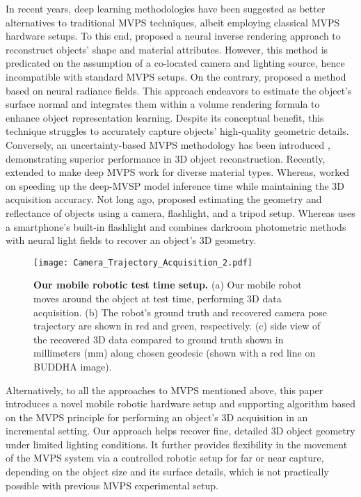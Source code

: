 \vspace{-0.2cm}
In recent years, deep learning methodologies have been suggested as better alternatives to traditional MVPS techniques, albeit employing classical MVPS hardware setups. To this end, \citep{zhang2022iron} proposed a neural inverse rendering approach to reconstruct objects' shape and material attributes. However, this method is predicated on the assumption of a co-located camera and lighting source, hence incompatible with standard MVPS setups. On the contrary, \citep{kaya2021neural}  proposed a method based on neural radiance fields. This approach endeavors to estimate the object's surface normal and integrates them within a volume rendering formula to enhance object representation learning. Despite its conceptual benefit, this technique struggles to accurately capture objects' high-quality geometric details.
Conversely, an uncertainty-based MVPS methodology has been introduced \citep{kaya2022uncertainty}, demonstrating superior performance in 3D object reconstruction. Recently, \citep{kaya2023multi} extended \citep{kaya2022uncertainty} to make deep MVPS work for diverse material types. Whereas, \citep{zhao2023mvpsnet} worked on speeding up the deep-MVSP model inference time while maintaining the 3D acquisition accuracy. Not long ago, \citep{lichy2021shape} proposed estimating the geometry and reflectance of objects using a camera, flashlight, and a tripod setup. Whereas \citep{Cheng_2023_CVPR} uses a smartphone’s built-in flashlight and combines darkroom photometric methods with neural light fields \citep{wang2021neus} to recover an object's 3D geometry. 

\begin{figure*}[t]
    \centering
\texttt{[image: Camera\_Trajectory\_Acquisition\_2.pdf]}
    \caption{\textbf{Our mobile robotic test time setup.} (a) Our mobile robot moves around the object at test time, performing 3D data acquisition. (b) The robot's ground truth and recovered camera pose trajectory are shown in red and green, respectively. (c) side view of the recovered 3D data compared to ground truth shown in millimeters (mm) along chosen geodesic (shown with a red line on BUDDHA image).}
    \label{fig:img_acquisition_camera_traj}
\end{figure*}

\smallskip
\smallskip
\noindent
Alternatively, to all the approaches to MVPS mentioned above, this paper introduces a novel mobile robotic hardware setup and supporting algorithm based on the MVPS principle for performing an object's 3D acquisition in an incremental setting. Our approach helps recover fine, detailed 3D object geometry under limited lighting conditions. It further provides flexibility in the movement of the MVPS system via a controlled robotic setup for far or near capture, depending on the object size and its surface details, which is not practically possible with previous MVPS experimental setup.